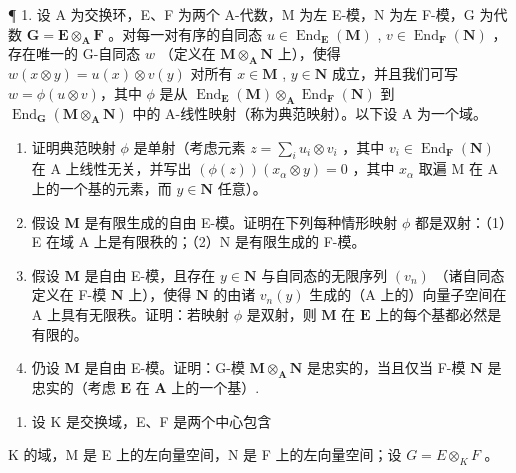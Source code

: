 \BourbakiExercisesSection

¶ 1. 设 A 为交换环，E、F 为两个 A-代数，M 为左 E-模，N 为左 F-模，G 为代数 \(\mathbf{G} = \mathbf{E} \otimes_{\mathbf{A}} \mathbf{F}\) 。对每一对有序的自同态 \(u \in \operatorname{End}_{\mathbf{E}}(\mathbf{M})\) , \(v \in \operatorname{End}_{\mathbf{F}}(\mathbf{N})\) ，存在唯一的 G-自同态 \(w\) （定义在 \(\mathbf{M} \otimes_{\mathbf{A}} \mathbf{N}\) 上），使得 \(w(x \otimes y) = u(x) \otimes v(y)\) 对所有 \(x \in \mathbf{M}\) , \(y \in \mathbf{N}\) 成立，并且我们可写 \(w = \phi(u \otimes v)\)，其中 \(\phi\) 是从 \(\operatorname{End}_{\mathbf{E}}(\mathbf{M}) \otimes_{\mathbf{A}} \operatorname{End}_{\mathbf{F}}(\mathbf{N})\) 到 \(\operatorname{End}_{\mathbf{G}}(\mathbf{M} \otimes_{\mathbf{A}} \mathbf{N})\) 中的 A-线性映射（称为典范映射）。以下设 A 为一个域。

\begin{enumerate}
\def\labelenumi{(\alph{enumi})}
\item
  证明典范映射 \(\phi\) 是单射（考虑元素 \(z = \sum_{i} u_{i} \otimes v_{i}\) ，其中 \(v_{i} \in \operatorname{End}_{\mathbf{F}}(\mathbf{N})\) 在 A 上线性无关，并写出 \((\phi(z))(x_{\alpha} \otimes y) = 0\) ，其中 \(x_{\alpha}\) 取遍 M 在 A 上的一个基的元素，而 \(y \in \mathbf{N}\) 任意）。
\item
  假设 \(\mathbf{M}\) 是有限生成的自由 E-模。证明在下列每种情形映射 \(\phi\) 都是双射：（1）E 在域 A 上是有限秩的；（2）N 是有限生成的 F-模。
\item
  假设 \(\mathbf{M}\) 是自由 E-模，且存在 \(y \in \mathbf{N}\) 与自同态的无限序列 \((v_n)\) （诸自同态定义在 F-模 \(\mathbf{N}\) 上），使得 \(\mathbf{N}\) 的由诸 \(v_n(y)\) 生成的（A 上的）向量子空间在 A 上具有无限秩。证明：若映射 \(\phi\) 是双射，则 \(\mathbf{M}\) 在 \(\mathbf{E}\) 上的每个基都必然是有限的。
\item
  仍设 \(\mathbf{M}\) 是自由 E-模。证明：G-模 \(\mathbf{M} \otimes_{\mathbf{A}} \mathbf{N}\) 是忠实的，当且仅当 F-模 \(\mathbf{N}\) 是忠实的（考虑 \(\mathbf{E}\) 在 \(\mathbf{A}\) 上的一个基）.
\end{enumerate}

\begin{enumerate}
\def\labelenumi{\arabic{enumi}.}
\setcounter{enumi}{1}
\tightlist
\item
  设 K 是交换域，E、F 是两个中心包含
\end{enumerate}

K 的域，M 是 E 上的左向量空间，N 是 F 上的左向量空间；设 \(G = E \otimes_{K} F\) 。

